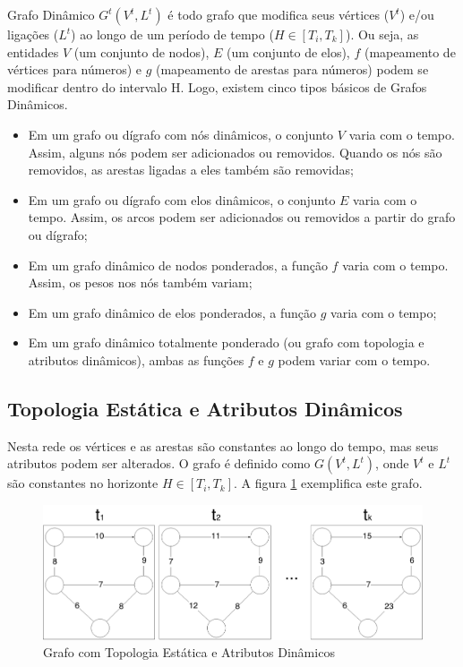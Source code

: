 Grafo Dinâmico $G^t(V^t, L^t)$ é todo grafo que modifica seus vértices ($V^t$) e/ou ligações ($L^t$)
ao longo de um período de tempo ($H \in [T_i, T_k]$). Ou seja, as entidades $V$ (um conjunto de nodos),
$E$ (um conjunto de elos), $f$ (mapeamento de vértices para números) e $g$ (mapeamento de arestas para números)
podem se modificar dentro do intervalo H.
Logo, existem cinco tipos básicos de Grafos Dinâmicos.

\begin{itemize}
\item Em um grafo ou dígrafo com nós dinâmicos, o conjunto $V$ varia com o tempo. Assim, alguns nós podem
ser adicionados ou removidos. Quando os nós são removidos, as arestas ligadas a eles também são removidas; 
\item Em um grafo ou dígrafo com elos dinâmicos, o conjunto $E$ varia com o tempo. Assim, os arcos podem
ser adicionados ou removidos a partir do grafo ou dígrafo;
\item Em um grafo dinâmico de nodos ponderados, a função $f$ varia com o tempo. Assim, os pesos nos nós também variam;
\item Em um grafo dinâmico de elos ponderados, a função $g$ varia com o tempo;
\item Em um grafo dinâmico totalmente ponderado (ou grafo com topologia e atributos dinâmicos), ambas as funções $f$ e $g$
podem variar com o tempo.
\end{itemize}

\subsection{Topologia Estática e Atributos Dinâmicos}
Nesta rede os vértices e as arestas são constantes ao longo do tempo, mas seus atributos podem ser alterados.
O grafo é definido como $G(V^t, L^t)$, onde $V^t$ e $L^t$ são constantes no horizonte $H \in [T_i, T_k]$.
A figura \ref{fig:tead} exemplifica este grafo.

\begin{figure}[htbp]
\centering
 \includegraphics[width=.80\textwidth]{chapters/fig/tead.png}
\caption{Grafo com Topologia Estática e Atributos Dinâmicos}
\label{fig:tead}
\end{figure}

